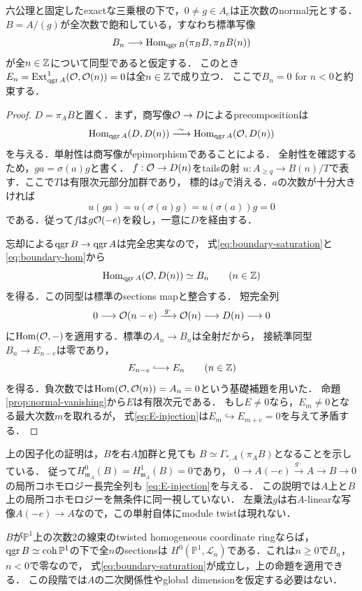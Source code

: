 \documentclass[11pt,a4paper]{ltjsarticle}
\begin{document}
\begin{proposition}\label{prop:saturated-boundary}
六公理と固定したexactな三乗根の下で，$0\ne g\in A_e$は正次数のnormal元とする．
$B=A/(g)$が全次数で飽和している，すなわち標準写像
\begin{equation}\label{eq:boundary-saturation}
 B_n\longrightarrow\operatorname{Hom}_{\operatorname{qgr} B}(\pi_BB,\pi_BB(n))
\end{equation}
が全$n\in\mathbb Z$について同型であると仮定する．
このとき$E_n=\operatorname{Ext}^1_{\operatorname{qgr} A}(\mathcal O,\mathcal O(n))=0$は全$n\in\mathbb Z$で成り立つ．
ここで$B_n=0$ for $n<0$と約束する．
\end{proposition}
\begin{proof}
$D=\pi_AB$と置く．まず，商写像$\mathcal O\to D$によるprecompositionは
\begin{equation}\label{eq:boundary-hom}
 \operatorname{Hom}_{\operatorname{qgr} A}(D,D(n))\xrightarrow{\ \sim\ }
 \operatorname{Hom}_{\operatorname{qgr} A}(\mathcal O,D(n))
\end{equation}
を与える．単射性は商写像がepimorphismであることによる．
全射性を確認するため，$ga=\sigma(a)g$と書く．
$f:\mathcal O\to D(n)$をtailsの射
$u:A_{\geq q}\to B(n)/T$で表す．ここで$T$は有限次元部分加群であり，
標的は$g$で消える．$a$の次数が十分大きければ
\[
 u(ga)=u(\sigma(a)g)=u(\sigma(a))g=0
\]
である．従って$f$は$g\mathcal O(-e)$を殺し，一意に$D$を経由する．

忘却による$\operatorname{qgr} B\to\operatorname{qgr} A$は完全忠実なので，
式\eqref{eq:boundary-saturation}と\eqref{eq:boundary-hom}から
\[
 \operatorname{Hom}_{\operatorname{qgr} A}(\mathcal O,D(n))\simeq B_n
 \qquad(n\in\mathbb Z)
\]
を得る．この同型は標準のsections mapと整合する．
短完全列
\[
 0\longrightarrow\mathcal O(n-e)\xrightarrow{\;g\cdot\;}\mathcal O(n)
 \longrightarrow D(n)\longrightarrow0
\]
に$\operatorname{Hom}(\mathcal O,-)$を適用する．標準の$A_n\to B_n$は全射だから，
接続準同型$B_n\to E_{n-e}$は零であり，
\begin{equation}\label{eq:E-injection}
 E_{n-e}\lhook\joinrel\longrightarrow E_n
 \qquad(n\in\Z)
\end{equation}
を得る．負次数では$\operatorname{Hom}(\mathcal O,\mathcal O(n))=A_n=0$という基礎補題を用いた．
命題\ref{prop:normal-vanishing}から$E$は有限次元である．
もし$E\ne0$なら，$E_m\ne0$となる最大次数$m$を取れるが，
式\eqref{eq:E-injection}は$E_m\hookrightarrow E_{m+e}=0$を与えて矛盾する．
\end{proof}

\begin{remark}[局所コホモロジーによる同じ結論とconicへの適用]
上の因子化の証明は，$B$を右$A$加群と見ても
$B\simeq\Gamma_{*,A}(\pi_AB)$となることを示している．
従って$H^0_{\mathfrak m_A}(B)=H^1_{\mathfrak m_A}(B)=0$であり，
$0\to A(-e)\xrightarrow{g\cdot}A\to B\to0$の局所コホモロジー長完全列も
\eqref{eq:E-injection}を与える．
この説明では$A$上と$B$上の局所コホモロジーを無条件に同一視していない．
左乗法$g$は右$A$-linearな写像$A(-e)\to A$なので，この単射自体にmodule twistは現れない．

$B$が$\mathbb P^1$上の次数2の線束のtwisted homogeneous coordinate ringならば，
$\operatorname{qgr} B\simeq\operatorname{coh}\mathbb P^1$の下で全$n$のsectionsは
$H^0(\mathbb P^1,\mathcal L_n)$である．これは$n\geq0$で$B_n$，$n<0$で零なので，
式\eqref{eq:boundary-saturation}が成立し，上の命題を適用できる．
この段階では$A$の二次関係性やglobal dimensionを仮定する必要はない．
\end{remark}
\end{document}
